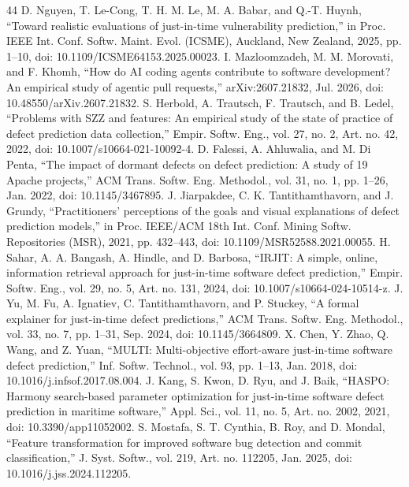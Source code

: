 \begin{thebibliography}{44}
 D. Nguyen, T. Le-Cong, T. H. M. Le, M. A. Babar, and Q.-T. Huynh, ``Toward realistic evaluations of just-in-time vulnerability prediction,'' in Proc. IEEE Int. Conf. Softw. Maint. Evol. (ICSME), Auckland, New Zealand, 2025, pp. 1--10, doi: \mbox{10.1109/ICSME64153.2025.00023}.
 I. Mazloomzadeh, M. M. Morovati, and F. Khomh, ``How do AI coding agents contribute to software development? An empirical study of agentic pull requests,'' arXiv:2607.21832, Jul. 2026, doi: \mbox{10.48550/arXiv.2607.21832}.
 S. Herbold, A. Trautsch, F. Trautsch, and B. Ledel, ``Problems with SZZ and features: An empirical study of the state of practice of defect prediction data collection,'' Empir. Softw. Eng., vol. 27, no. 2, Art. no. 42, 2022, doi: \mbox{10.1007/s10664-021-10092-4}.
 D. Falessi, A. Ahluwalia, and M. Di Penta, ``The impact of dormant defects on defect prediction: A study of 19 Apache projects,'' ACM Trans. Softw. Eng. Methodol., vol. 31, no. 1, pp. 1--26, Jan. 2022, doi: \mbox{10.1145/3467895}.
 J. Jiarpakdee, C. K. Tantithamthavorn, and J. Grundy, ``Practitioners' perceptions of the goals and visual explanations of defect prediction models,'' in Proc. IEEE/ACM 18th Int. Conf. Mining Softw. Repositories (MSR), 2021, pp. 432--443, doi: \mbox{10.1109/MSR52588.2021.00055}.
 H. Sahar, A. A. Bangash, A. Hindle, and D. Barbosa, ``IRJIT: A simple, online, information retrieval approach for just-in-time software defect prediction,'' Empir. Softw. Eng., vol. 29, no. 5, Art. no. 131, 2024, doi: \mbox{10.1007/s10664-024-10514-z}.
 J. Yu, M. Fu, A. Ignatiev, C. Tantithamthavorn, and P. Stuckey, ``A formal explainer for just-in-time defect predictions,'' ACM Trans. Softw. Eng. Methodol., vol. 33, no. 7, pp. 1--31, Sep. 2024, doi: \mbox{10.1145/3664809}.
 X. Chen, Y. Zhao, Q. Wang, and Z. Yuan, ``MULTI: Multi-objective effort-aware just-in-time software defect prediction,'' Inf. Softw. Technol., vol. 93, pp. 1--13, Jan. 2018, doi: \mbox{10.1016/j.infsof.2017.08.004}.
 J. Kang, S. Kwon, D. Ryu, and J. Baik, ``HASPO: Harmony search-based parameter optimization for just-in-time software defect prediction in maritime software,'' Appl. Sci., vol. 11, no. 5, Art. no. 2002, 2021, doi: \mbox{10.3390/app11052002}.
 S. Mostafa, S. T. Cynthia, B. Roy, and D. Mondal, ``Feature transformation for improved software bug detection and commit classification,'' J. Syst. Softw., vol. 219, Art. no. 112205, Jan. 2025, doi: \mbox{10.1016/j.jss.2024.112205}.

\end{thebibliography}
